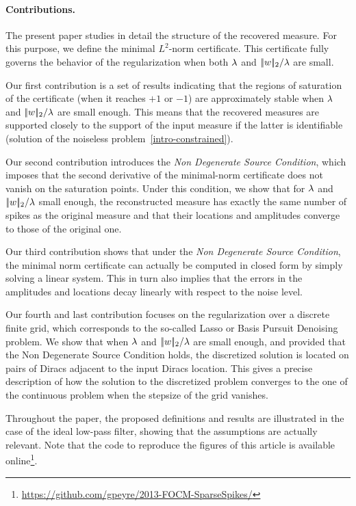 \paragraph{Contributions.} 

The present paper studies in detail the structure of the recovered measure. For this purpose, we define the minimal $L^2$-norm certificate. This certificate fully governs the behavior of the regularization when both $\lambda$ and $|\!| w |\!|_2/\lambda$ are small. 

Our first contribution is a set of results indicating that the regions of saturation of the certificate (when it reaches $+1$ or $-1$) are approximately stable when $\lambda$ and $|\!| w |\!|_2/\lambda$ are small enough. This means that the recovered measures are supported closely to the support of the input measure if the latter is identifiable (solution of the noiseless problem~\eqref{intro-constrained}). 

Our second contribution introduces the \textit{Non Degenerate Source Condition}, which imposes that the second derivative of the minimal-norm certificate does not vanish on the saturation points. Under this condition, we show that for $\lambda$ and $|\!| w |\!|_2/\lambda$ small enough, the reconstructed measure has exactly the same number of spikes as the original measure and that their locations and amplitudes converge to those of the original one.

Our third contribution shows that under the \textit{Non Degenerate Source Condition}, the minimal norm certificate can actually be computed in closed form by simply solving a linear system. This in turn also implies that the errors in the amplitudes and locations decay linearly with respect to the noise level. 

Our fourth and last contribution focuses on the regularization over a discrete finite grid, which corresponds to the so-called Lasso or Basis Pursuit Denoising problem. We show that when $\lambda$ and $|\!| w |\!|_2/\lambda$ are small enough, and provided that the Non Degenerate Source Condition holds, the discretized solution is located on pairs of Diracs adjacent to the input Diracs location. This gives a precise description of how the solution to the discretized problem converges to the one of the continuous problem when the stepsize of the grid vanishes.

Throughout the paper, the proposed definitions and results are illustrated in the case of the ideal low-pass filter, showing that the assumptions are actually relevant. Note that the code to reproduce the figures of this article is available online\footnote{\url{https://github.com/gpeyre/2013-FOCM-SparseSpikes/}}.
 
